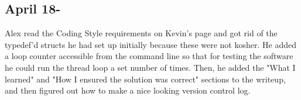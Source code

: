 \documentclass[letterpaper,10pt,titlepage]{article}
\begin{document}
\subsection{April 18- }
Alex read the Coding Style requirements on Kevin's page and got rid of the typedef'd structs he had set up initially because these were not kosher. He added a loop counter accessible from the command line so that for testing the software he could run the thread loop a set number of times. Then, he added the "What I learned" and "How I ensured the solution was correct" sections to the writeup, and then figured out how to make a nice looking version control log.

%
%
\end{document}
